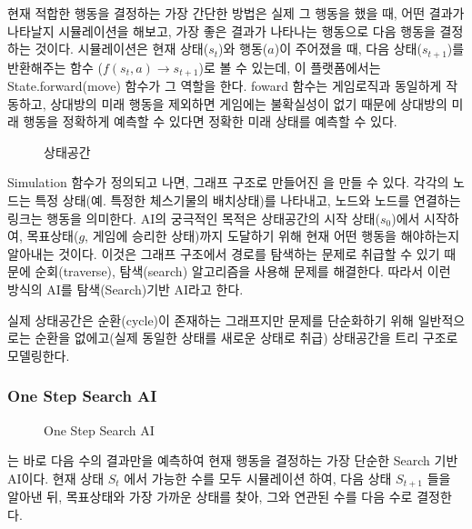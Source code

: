 \documentclass[letterpaper,10pt,english]{sphinxmanual}
\begin{document}
현재 적합한 행동을 결정하는 가장 간단한 방법은 실제 그 행동을 했을 때, 어떤 결과가 나타날지 시뮬레이션을 해보고,
가장 좋은 결과가 나타나는 행동으로 다음 행동을 결정하는 것이다.
시뮬레이션은 현재 상태(\(s_t\))와 행동(\(a\))이 주어졌을 때, 다음 상태(\(s_{t+1}\))를 반환해주는 함수
(\(f(s_t, a) \rightarrow s_{t+1}\))로 볼 수 있는데, 이 플랫폼에서는 State.forward(move) 함수가 그 역할을 한다.
foward 함수는 게임로직과 동일하게 작동하고, 상대방의 미래 행동을 제외하면 게임에는 불확실성이 없기 때문에
상대방의 미래 행동을 정확하게 예측할 수 있다면 정확한 미래 상태를 예측할 수 있다.

\begin{figure}[htbp]
\centering
\capstart

\noindent{}
\caption{상태공간}\label{\detokenize{03-basic_ai_examples:state-space-example}}\label{\detokenize{03-basic_ai_examples:id29}}\end{figure}

Simulation 함수가 정의되고 나면, 그래프 구조로 만들어진 {\hyperref[\detokenize{03-basic_ai_examples:state-space-example}]{}} 을 만들 수 있다.
각각의 노드는 특정 상태(예. 특정한 체스기물의 배치상태)를 나타내고,
노드와 노드를 연결하는 링크는 행동을 의미한다. AI의 궁극적인 목적은 상태공간의 시작 상태(\(s_0\))에서 시작하여,
목표상태(\(g\), 게임에 승리한 상태)까지 도달하기 위해 현재 어떤 행동을 해야하는지 알아내는 것이다.
이것은 그래프 구조에서 경로를 탐색하는 문제로 취급할 수 있기 때문에 순회(traverse), 탐색(search) 알고리즘을 사용해 문제를 해결한다.
따라서 이런 방식의 AI를 탐색(Search)기반 AI라고 한다.

실제 상태공간은 순환(cycle)이 존재하는 그래프지만 문제를 단순화하기 위해 일반적으로는
순환을 없에고(실제 동일한 상태를 새로운 상태로 취급) 상태공간을 트리 구조로 모델링한다.


\subsubsection{One Step Search AI}
\label{\detokenize{03-basic_ai_examples:one-step-search-ai}}
\begin{figure}[htbp]
\centering
\capstart

\noindent{}
\caption{One Step Search AI}\label{\detokenize{03-basic_ai_examples:id2}}\label{\detokenize{03-basic_ai_examples:id30}}\end{figure}

{\hyperref[\detokenize{03-basic_ai_examples:id2}]{}} 는 바로 다음 수의 결과만을 예측하여 현재 행동을 결정하는 가장 단순한 Search 기반 AI이다.
현재 상태 \(S_t\) 에서 가능한 수를 모두 시뮬레이션 하여, 다음 상태 \(S_{t+1}\) 들을 알아낸 뒤,
목표상태와 가장 가까운 상태를 찾아, 그와 연관된 수를 다음 수로 결정한다.
\end{document}
